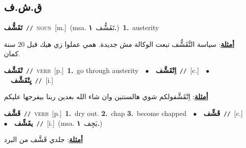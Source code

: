 \documentclass[10pt,a4paper,twoside]{article} %
\begin{document}
\begin{multicols}{2}
\vspace{-3mm}
\subsection*{\color{blue}\foreignlanguage{arabic}{ق.ش.ف}\color{blue}{}} 

{\setlength\topsep{0pt}\textbf{\foreignlanguage{arabic}{تَقَشُّف}}\ {\color{gray}\texttt{//}\color{black}}\ \textsc{noun}\ [m.]\ \color{gray}(msa. \foreignlanguage{arabic}{تَقَشُّف}~\foreignlanguage{arabic}{\textbf{١.}})\color{black}\ \textbf{1.}~austerity\  \begin{flushright}\color{gray}\foreignlanguage{arabic}{\textbf{\underline{\foreignlanguage{arabic}{أمثلة}}}: سياسة التَّقَشُّف تبعت الوكالة مش جديدة. همي عملوا زي هيك قبل 20 سنة كمان.}\end{flushright}\color{black}} \vspace{2mm}

{\setlength\topsep{0pt}\textbf{\foreignlanguage{arabic}{تْقَشَّف}}\ {\color{gray}\texttt{//}\color{black}}\ \textsc{verb}\ [p.]\ \textbf{1.}~go through austerity\ \ $\bullet$\ \ \setlength\topsep{0pt}\textbf{\foreignlanguage{arabic}{اِتْقَشَّف}}\ {\color{gray}\texttt{//}\color{black}}\ [c.]\ \ $\bullet$\ \ \setlength\topsep{0pt}\textbf{\foreignlanguage{arabic}{يِتْقَشَّف}}\ {\color{gray}\texttt{//}\color{black}}\ [i.]\  \begin{flushright}\color{gray}\foreignlanguage{arabic}{\textbf{\underline{\foreignlanguage{arabic}{أمثلة}}}: اِتْقَشَّفولكم شوي هالسنتين وان شاء الله بعدين ربنا بيفرجها عليكم}\end{flushright}\color{black}} \vspace{2mm}

{\setlength\topsep{0pt}\textbf{\foreignlanguage{arabic}{قَشَّف}}\ {\color{gray}\texttt{//}\color{black}}\ \textsc{verb}\ [p.]\ \textbf{1.}~dry out.  \textbf{2.}~chap  \textbf{3.}~become chapped\ \ $\bullet$\ \ \setlength\topsep{0pt}\textbf{\foreignlanguage{arabic}{قَشِّف}}\ {\color{gray}\texttt{//}\color{black}}\ [c.]\ \ $\bullet$\ \ \setlength\topsep{0pt}\textbf{\foreignlanguage{arabic}{يقَشِّف}}\ {\color{gray}\texttt{//}\color{black}}\ [i.]\ \color{gray}(msa. \foreignlanguage{arabic}{يَجِف}~\foreignlanguage{arabic}{\textbf{١.}})\color{black}\  \begin{flushright}\color{gray}\foreignlanguage{arabic}{\textbf{\underline{\foreignlanguage{arabic}{أمثلة}}}: جلدي قَشَّف من البرد}\end{flushright}\color{black}} \vspace{2mm}


\end{multicols}
\end{document}
